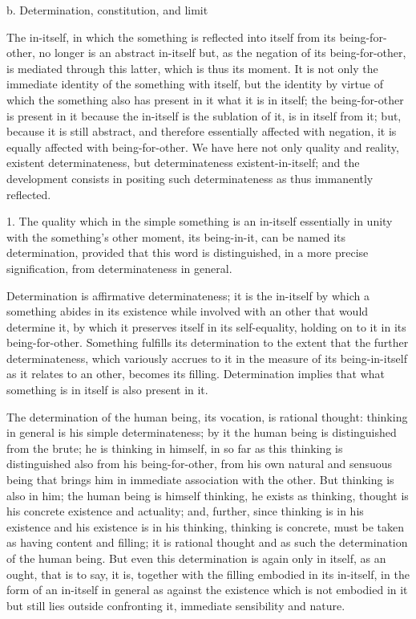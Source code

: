 b. Determination, constitution, and limit

The in-itself, in which the something is
reflected into itself from its being-for-other,
no longer is an abstract in-itself
but, as the negation of its being-for-other,
is mediated through this latter,
which is thus its moment.
It is not only the immediate identity of
the something with itself,
but the identity by virtue of which
the something also has present in it
what it is in itself;
the being-for-other is present in it
because the in-itself is the sublation of it,
is in itself from it;
but, because it is still abstract,
and therefore essentially affected with negation,
it is equally affected with being-for-other.
We have here not only quality and reality,
existent determinateness,
but determinateness existent-in-itself;
and the development consists in positing
such determinateness as thus immanently reflected.

1. The quality which in the simple something is
an in-itself essentially in unity with the something's
other moment, its being-in-it,
can be named its determination,
provided that this word is distinguished,
in a more precise signification,
from determinateness in general.

Determination is affirmative determinateness;
it is the in-itself by which a something abides in its
existence while involved with an other that would determine it,
by which it preserves itself in its self-equality,
holding on to it in its being-for-other.
Something fulfills its determination
to the extent that the further determinateness,
which variously accrues to it in the measure of its being-in-itself
as it relates to an other, becomes its filling.
Determination implies that what something is
in itself is also present in it.

The determination of the human being,
its vocation, is rational thought:
thinking in general is his simple determinateness;
by it the human being is distinguished from the brute;
he is thinking in himself, in so far as this thinking is
distinguished also from his being-for-other,
from his own natural and sensuous being
that brings him in immediate association with the other.
But thinking is also in him;
the human being is himself thinking,
he exists as thinking,
thought is his concrete existence and actuality;
and, further, since thinking is in his existence
and his existence is in his thinking, thinking is concrete,
must be taken as having content and filling;
it is rational thought and as such
the determination of the human being.
But even this determination is again
only in itself, as an ought, that is to say,
it is, together with the filling embodied in its in-itself,
in the form of an in-itself in general
as against the existence which is not embodied in it
but still lies outside confronting it,
immediate sensibility and nature.


